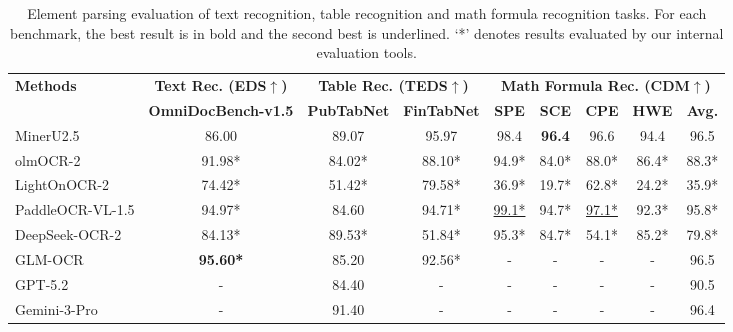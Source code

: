 \begin{table}[htbp]
\centering
\caption{Element parsing evaluation of text recognition, table recognition and math formula recognition tasks. For each benchmark, the best result is in bold and the second best is underlined. `*' denotes results evaluated by our internal evaluation tools.}
\label{tab:element_parsing_public}
\small
\begin{tabular}{lcccccccc}
\toprule
\multirow{2}{*}{\textbf{Methods}} & \textbf{Text Rec. (EDS$\uparrow$)} & \multicolumn{2}{c}{\textbf{Table Rec. (TEDS$\uparrow$)}} & \multicolumn{5}{c}{\textbf{Math Formula Rec. (CDM$\uparrow$)}} \\
\cmidrule(lr){2-2} \cmidrule(lr){3-4} \cmidrule(lr){5-9}
 & \textbf{OmniDocBench-v1.5} & \textbf{PubTabNet} & \textbf{FinTabNet} & \textbf{SPE} & \textbf{SCE} & \textbf{CPE} & \textbf{HWE} & \textbf{Avg.} \\
\midrule
MinerU2.5 & 86.00 & 89.07 & 95.97 & 98.4 & \textbf{96.4} & 96.6 & 94.4 & 96.5 \\
olmOCR-2 & 91.98* & 84.02* & 88.10* & 94.9* & 84.0* & 88.0* & 86.4* & 88.3* \\
LightOnOCR-2 & 74.42* & 51.42* & 79.58* & 36.9* & 19.7* & 62.8* & 24.2* & 35.9* \\
PaddleOCR-VL-1.5 & 94.97* & 84.60 & 94.71* & \underline{99.1*} & 94.7* & \underline{97.1*} & 92.3* & 95.8* \\
DeepSeek-OCR-2 & 84.13* & 89.53* & 51.84* & 95.3* & 84.7* & 54.1* & 85.2* & 79.8* \\
GLM-OCR & \textbf{95.60*} & 85.20 & 92.56* & - & - & - & - & 96.5 \\
\midrule
GPT-5.2 & - & 84.40 & - & - & - & - & - & 90.5 \\
Gemini-3-Pro & - & 91.40 & - & - & - & - & - & 96.4 \\

\end{tabular}
\end{table}
